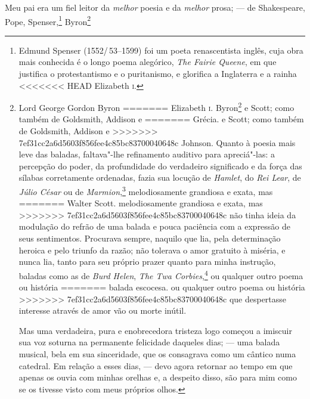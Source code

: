 {{{{{{{{{{{{{{{{{{Meu pai era um fiel leitor da \textit{melhor} poesia e da \textit{melhor}
prosa; --- de Shakespeare, Pope, Spenser,\footnote{Edmund Spenser (1552/\,53--1599) foi um poeta renascentista inglês, cuja obra mais conhecida é o
  longo poema alegórico, \textit{The Fairie Queene}, em que justifica o
  protestantismo e o puritanismo, e glorifica a Inglaterra e a rainha
<<<<<<< HEAD
  Elizabeth \textsc{i}.} Byron\footnote{Lord George Gordon Byron
=======
  Elizabeth \textsc{i}.  Byron\footnote{Lord George Gordon Byron
>>>>>>> 7ef31cc2a6d5603f856fee4c85bc83700040648c
  (1788--1824) foi um poeta romântico inglês, famoso em seu tempo pela
  poesia pessoal e satírica e pela conturbada vida amorosa. Sua lendária
  morte em Missolonghi, durante a campanha pela independência grega dos
  turcos, foi profundamente pranteada e o tornou herói nacional da
<<<<<<< HEAD
  Grécia.} e Scott; como também de Goldsmith, Addison e
=======
  Grécia.  e Scott; como também de Goldsmith, Addison e
>>>>>>> 7ef31cc2a6d5603f856fee4c85bc83700040648c
Johnson. Quanto à poesia mais leve das baladas, faltava"-lhe refinamento
auditivo para apreciá"-las: a percepção do poder, da profundidade do
verdadeiro significado e da força das sílabas corretamente ordenadas,
fazia sua locução de \textit{Hamlet}, do \textit{Rei Lear}, de \textit{Júlio
César} ou de \textit{Marmion},\footnote{Título de um poema épico de Sir
<<<<<<< HEAD
  Walter Scott.} melodiosamente grandiosa e exata, mas
=======
  Walter Scott.  melodiosamente grandiosa e exata, mas
>>>>>>> 7ef31cc2a6d5603f856fee4c85bc83700040648c
não tinha ideia da modulação do refrão de uma balada e pouca paciência
com a expressão de seus sentimentos. Procurava sempre, naquilo que lia,
pela determinação heroica e pelo triunfo da razão; não tolerava o amor
gratuito à miséria, e nunca lia, tanto para seu próprio prazer quanto
para minha instrução, baladas como as de \textit{Burd Helen}, \textit{The
Twa Corbies},\footnote{{[}\textit{Os dois corvos}, em celta{]}. Título de uma
<<<<<<< HEAD
  balada escocesa.} ou qualquer outro poema ou história
=======
  balada escocesa.  ou qualquer outro poema ou história
>>>>>>> 7ef31cc2a6d5603f856fee4c85bc83700040648c
que despertasse interesse através de amor vão ou morte inútil.

Mas uma verdadeira, pura e enobrecedora tristeza logo começou a imiscuir
sua voz soturna na permanente felicidade daqueles dias; --- uma balada
musical, bela em sua sinceridade, que os consagrava como um cântico numa
catedral. Em relação a esses dias, --- devo agora retornar ao tempo em
que apenas os ouvia com minhas orelhas e, a despeito disso, são para mim
como se os tivesse visto com meus próprios olhos.

}}}}}}}}}}}}}}}}}}}
